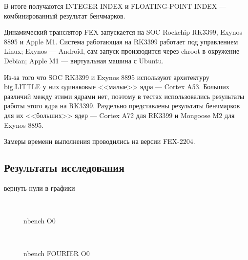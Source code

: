 В итоге получаются INTEGER INDEX и FLOATING-POINT INDEX --- комбинированный результат бенчмарков.

Динамический транслятор FEX запускается на SOC Rockchip RK3399, Exynos 8895 и Apple M1. Система работающая на RK3399 работает под управлением Linux; Exynos --- Android, сам запуск производится через chroot в окружение Debian; Apple M1 --- виртуальная машина с Ubuntu.

Из-за того что SOC RK3399 и Exynos 8895 используют архитектуру \\ big.LITTLE у них одинаковые <<малые>> ядра --- Cortex A53. Больших различий между этими ядрами нет, поэтому в тестах использовались результаты работы этого ядра на RK3399. Раздельно представлены результаты бенчмарков для их <<больших>> ядер --- Cortex A72 для RK3399 и Mongoose M2 для Exynos 8895.

Замеры времени выполнения проводились на версии FEX-2204.

\subsection{Результаты исследования}

вернуть нули в графики

\begin{figure}[hbtp]
	\centering
	\\
	\caption{nbench O0}
	\label{fig:speed}
\end{figure}

\begin{figure}[hbtp]
	\centering
	\\
	\caption{nbench FOURIER O0}
	\label{fig:speed}
\end{figure}

